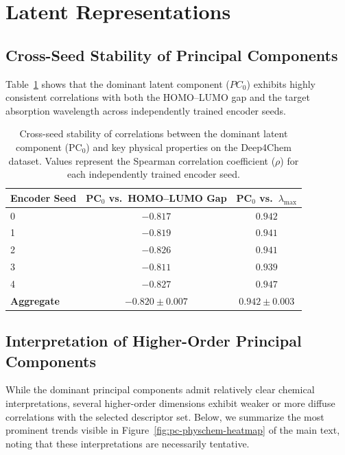 \section{Latent Representations}

\subsection{Cross-Seed Stability of Principal Components}
Table~\ref{tab:pc0_stability_deep4chem} shows that the dominant latent component ($PC_0$) exhibits highly consistent correlations with both the HOMO--LUMO gap and the target absorption wavelength across independently trained encoder seeds.
\begin{table}[ht]
\centering
\caption{Cross-seed stability of correlations between the dominant latent component (PC$_0$) and key physical properties on the Deep4Chem dataset. Values represent the Spearman correlation coefficient ($\rho$) for each independently trained encoder seed.}
\label{tab:pc0_stability_deep4chem}
\begin{tabular}{lcc}
\toprule
Encoder Seed & \textbf{PC$_0$ vs.\ HOMO--LUMO Gap} & \textbf{PC$_0$ vs.\ $\lambda_{\max}$} \\
\midrule
0 & $-0.817$ & $0.942$ \\
1 & $-0.819$ & $0.941$ \\
2 & $-0.826$ & $0.941$ \\
3 & $-0.811$ & $0.939$ \\
4 & $-0.827$ & $0.947$ \\
\midrule
\textbf{Aggregate} & $\mathbf{-0.820 \pm 0.007}$ & $\mathbf{0.942 \pm 0.003}$ \\
\bottomrule
\end{tabular}
\end{table}

\FloatBarrier

\subsection{Interpretation of Higher-Order Principal Components}

While the dominant principal components admit relatively clear chemical interpretations, several higher-order dimensions exhibit weaker or more diffuse correlations with the selected descriptor set. Below, we summarize the most prominent trends visible in Figure~\ref{fig:pc-physchem-heatmap} of the main text, noting that these interpretations are necessarily tentative.

